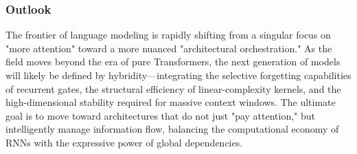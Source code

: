\documentclass[11pt]{article}
\begin{document}
\subsubsection{Outlook}

The frontier of language modeling is rapidly shifting from a singular focus on "more attention" toward a more nuanced "architectural orchestration." As the field moves beyond the era of pure Transformers, the next generation of models will likely be defined by hybridity—integrating the selective forgetting capabilities of recurrent gates, the structural efficiency of linear-complexity kernels, and the high-dimensional stability required for massive context windows. The ultimate goal is to move toward architectures that do not just "pay attention," but intelligently manage information flow, balancing the computational economy of RNNs with the expressive power of global dependencies.
\end{document}

